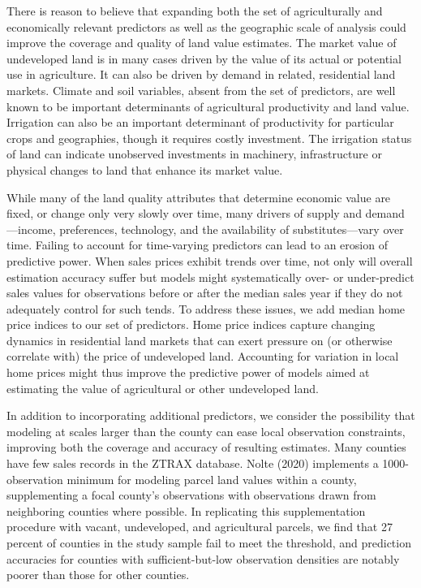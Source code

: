 \documentclass[12pt]{article}
\begin{document}
There is reason to believe that expanding both the set of agriculturally and economically relevant predictors as well as the geographic scale of analysis could improve the coverage and quality of land value estimates. The market value of undeveloped land is in many cases driven by the value of its actual or potential use in agriculture. It can also be driven by demand in related, residential land markets. Climate and soil variables, absent from the set of \textcite{Nolte2020High-resolutionStates} predictors, are well known to be important determinants of agricultural productivity and land value. Irrigation can also be an important determinant of productivity for particular crops and geographies, though it requires costly investment. The irrigation status of land can indicate unobserved investments in machinery, infrastructure or physical changes to land that enhance its market value. 

While many of the land quality attributes that determine economic value are fixed, or change only very slowly over time, many drivers of supply and demand—income, preferences, technology, and the availability of substitutes---vary over time. Failing to account for time-varying predictors can lead to an erosion of predictive power. When sales prices exhibit trends over time, not only will overall estimation accuracy suffer but models might systematically over- or under-predict sales values for observations before or after the median sales year if they do not adequately control for such tends. To address these issues, we add median home price indices to our set of predictors. Home price indices capture changing dynamics in residential land markets that can exert pressure on (or otherwise correlate with) the price of undeveloped land. Accounting for variation in local home prices might thus improve the predictive power of models aimed at estimating the value of agricultural or other undeveloped land. 

In addition to incorporating additional predictors, we consider the possibility that modeling at scales larger than the county can ease local observation constraints, improving both the coverage and accuracy of resulting estimates. Many counties have few sales records in the ZTRAX database. Nolte (2020) implements a 1000-observation minimum for modeling parcel land values within a county, supplementing a focal county’s observations with observations drawn from neighboring counties where possible. In replicating  this supplementation procedure with vacant, undeveloped, and agricultural parcels, we find that 27 percent of counties in the study sample fail to meet the threshold, and prediction accuracies for counties with sufficient-but-low observation densities are notably poorer than those for other counties. 
\end{document}
